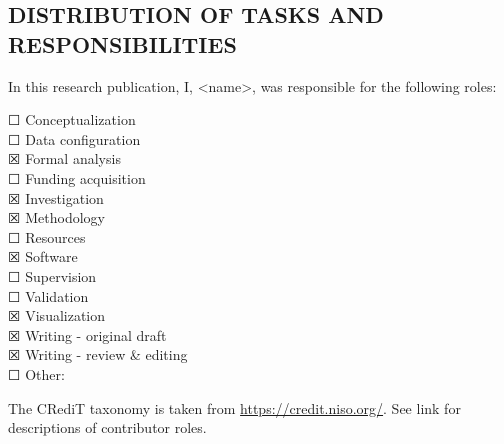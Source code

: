 \subsection*{DISTRIBUTION OF TASKS AND RESPONSIBILITIES}
In this research publication, I, <name>, was responsible for the following roles:\\
\begin{singlespace}
  {\stix ☐} Conceptualization\\
  {\stix ☐} Data configuration\\
  {\stix ☒} Formal analysis\\
  {\stix ☐} Funding acquisition\\
  {\stix ☒} Investigation\\
  {\stix ☒} Methodology\\
  {\stix ☐} Resources\\
  {\stix ☒} Software\\
  {\stix ☐} Supervision\\
  {\stix ☐} Validation\\
  {\stix ☒} Visualization\\
  {\stix ☒} Writing - original draft\\
  {\stix ☒} Writing - review \& editing\\
  {\stix ☐} Other:\\
\end{singlespace}

{\footnotesize\noindent The CRediT taxonomy is taken from \url{https://credit.niso.org/}. See link for descriptions of contributor roles.}

